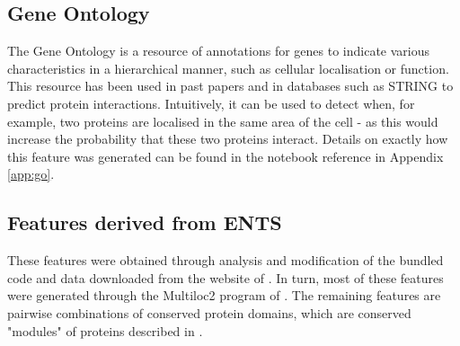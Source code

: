 \subsection{Gene Ontology}
\label{go}

The Gene Ontology\autocite{ashburner_gene_2000} is a resource of annotations for genes to indicate various characteristics in a hierarchical manner, such as cellular localisation or function.
This resource has been used in past papers\autocite{qi_evaluation_2006} and in databases such as \ac{STRING}\autocite{von_mering_string:_2005} to predict protein interactions.
Intuitively, it can be used to detect when, for example, two proteins are localised in the same area of the cell - as this would increase the probability that these two proteins interact.
Details on exactly how this feature was generated can be found in the notebook reference in Appendix \ref{app:go}.

\subsection{Features derived from ENTS}
\label{ents}

These features were obtained through analysis and modification of the bundled code and data downloaded from the website of \textcite{rodgers-melnick_predicting_2013}.
In turn, most of these features were generated through the Multiloc2 program of \textcite{blum_multiloc2:_2009}.
The remaining features are pairwise combinations of conserved protein domains, which are conserved "modules" of proteins described in \textcite{janin_domains_1985}.

